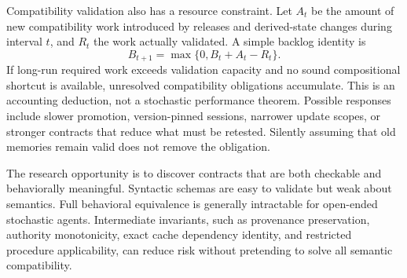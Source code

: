 Compatibility validation also has a resource constraint. Let $A_t$ be the amount of new compatibility work introduced by releases and derived-state changes during interval $t$, and $R_t$ the work actually validated. A simple backlog identity is
\begin{equation}
 B_{t+1}=\max\{0,B_t+A_t-R_t\}.
\end{equation}
If long-run required work exceeds validation capacity and no sound compositional shortcut is available, unresolved compatibility obligations accumulate. This is an accounting deduction, not a stochastic performance theorem. Possible responses include slower promotion, version-pinned sessions, narrower update scopes, or stronger contracts that reduce what must be retested. Silently assuming that old memories remain valid does not remove the obligation.

The research opportunity is to discover contracts that are both checkable and behaviorally meaningful. Syntactic schemas are easy to validate but weak about semantics. Full behavioral equivalence is generally intractable for open-ended stochastic agents. Intermediate invariants, such as provenance preservation, authority monotonicity, exact cache dependency identity, and restricted procedure applicability, can reduce risk without pretending to solve all semantic compatibility.

